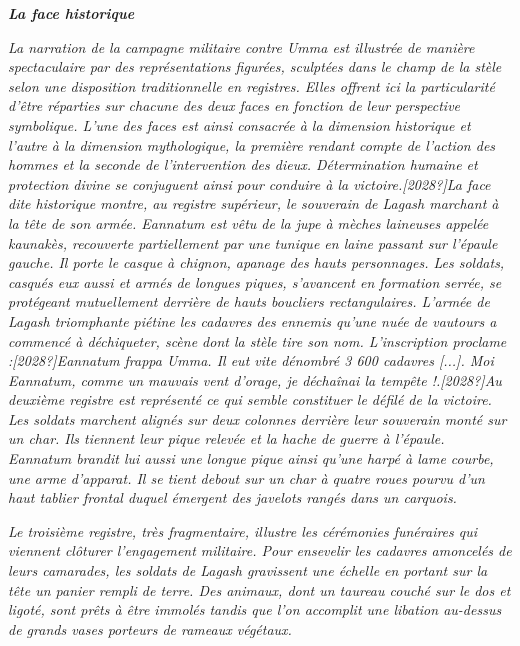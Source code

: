 \documentclass[a4paper]{article}
\begin{document}
{
\textbf{\textit{La face {\textquotedbl}historique{\textquotedbl}}}}

{
\textit{La narration de la campagne militaire contre Umma est illustrée
de manière spectaculaire par des représentations figurées, sculptées
dans le champ de la stèle selon une disposition traditionnelle en
registres. Elles offrent ici la particularité d'être réparties sur
chacune des deux faces en fonction de leur perspective symbolique.
L'une des faces est ainsi consacrée à la dimension
{\textquotedbl}historique{\textquotedbl} et l'autre à la}
\textit{dimension {\textquotedbl}mythologique{\textquotedbl}, la
première rendant compte de l'action des hommes et la seconde de
l'intervention des dieux. Détermination humaine et protection divine se
conjuguent ainsi pour conduire à la victoire.[2028?]La face dite
{\textquotedbl}historique{\textquotedbl} montre, au registre supérieur,
le souverain de Lagash marchant à la tête de son armée. Eannatum est
vêtu de la jupe à mèches laineuses appelée kaunakès, recouverte
partiellement par une tunique en laine passant sur l'épaule gauche. Il
porte le casque à chignon, apanage des hauts personnages. Les soldats,
casqués eux aussi et armés de longues piques, s'avancent en formation
serrée, se protégeant mutuellement derrière de hauts boucliers
rectangulaires. L'armée de Lagash triomphante piétine les cadavres des
ennemis qu'une nuée de vautours a commencé à déchiqueter, scène dont la
stèle tire son nom. L'inscription proclame
:[2028?]{\textquotedbl}}\textit{Eannatum }\textit{frappa Umma. Il eut
vite dénombré 3 600 cadavres [...]. Moi Eannatum, comme un mauvais vent
d'orage, je déchaînai la tempête !}\textit{{\textquotedbl}.[2028?]Au
deuxième registre est représenté ce qui semble constituer le défilé de
la victoire. Les soldats marchent alignés sur deux colonnes derrière
leur souverain monté sur un char. Ils tiennent leur pique relevée et la
hache de guerre à l'épaule. Eannatum brandit lui aussi une longue pique
ainsi qu'une harpé à lame courbe, une arme d'apparat. Il se tient
debout sur un char à quatre roues pourvu d'un haut tablier frontal
duquel émergent des javelots rangés dans un carquois.}}

{
\textit{Le troisième registre, très fragmentaire, illustre les
cérémonies funéraires qui viennent clôturer l'engagement militaire.
Pour ensevelir les cadavres amoncelés de leurs camarades, les soldats
de Lagash gravissent une échelle en portant sur la tête un panier
rempli de terre. Des animaux, dont un taureau couché sur le dos et
ligoté, sont prêts à être immolés tandis que l'on accomplit une
libation au-dessus de grands vases porteurs de rameaux végétaux.}}
\end{document}
